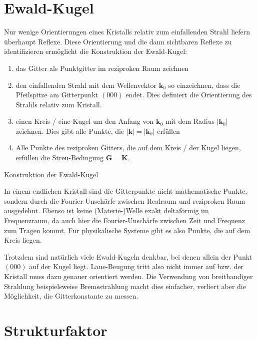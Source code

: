 \section{Ewald-Kugel} 
Nur wenige Orientierungen eines Kristalls relativ zum einfallenden Strahl liefern überhaupt Reflexe. Diese Orientierung und die dann sichtbaren Reflexe zu identifizieren ermöglicht die Konstruktion der Ewald-Kugel:
\begin{enumerate} \setlength{\itemsep}{0pt}
\item das Gitter als Punktgitter im reziproken Raum zeichnen

\item den einfallenden Strahl mit dem Wellenvektor $\mathbf{k}_0$ so einzeichnen, dass die Pfeilspitze am Gitterpunkt $(000)$ endet. Dies definiert die Orientierung des Strahls relativ zum Kristall.

\item einen Kreis / eine Kugel um den Anfang von  $\mathbf{k}_0$  mit dem Radius $|\mathbf{k}_0|$ zeichnen. Dies gibt alle Punkte, die $|\mathbf{k}| = |\mathbf{k}_0|$ erfüllen

\item Alle Punkte des reziproken Gitters, die auf dem Kreis / der Kugel liegen, erfüllen die Streu-Bedingung $\mathbf{G} =\mathbf{K} $.
\end{enumerate}

\begin{marginfigure}

\caption{ Konstruktion der Ewald-Kugel}
\end{marginfigure}


In einem endlichen Kristall sind die Gitterpunkte nicht mathematische Punkte, sondern durch die Fourier-Unschärfe zwischen Realraum und reziproken Raum ausgedehnt. Ebenso ist keine (Materie-)Welle exakt deltaförmig im Frequenzraum, da auch hier die Fourier-Unschärfe zwischen Zeit und Frequenz zum Tragen kommt. Für physikalische Systeme gibt es also Punkte, die auf dem Kreis liegen.

Trotzdem sind natürlich viele Ewald-Kugeln denkbar, bei denen allein der Punkt $(000)$ auf der Kugel liegt. Laue-Beugung tritt also nicht immer auf bzw. der Kristall muss dazu genauer orientiert werden. Die Verwendung von breitbandiger Strahlung beispielsweise Bremsstrahlung macht dies einfacher, verliert aber die Möglichkeit, die Gitterkonstante zu messen.

\section{Strukturfaktor}

